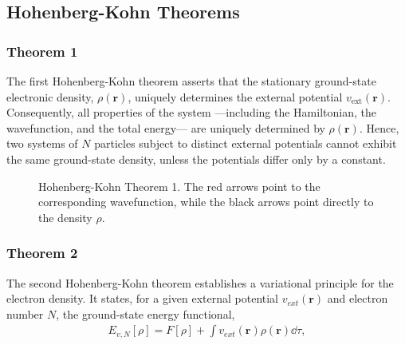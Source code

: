 \vfill%
\subsection{Hohenberg-Kohn Theorems~\cite{Hohenberg1964}}\label{HKteoremitas}
\subsubsection{Theorem 1}

The first Hohenberg-Kohn theorem asserts that the stationary ground-state electronic
density, $\rho(\mathbf{r})$, uniquely determines the external potential
$v_{\text{ext}}(\mathbf{r})$. Consequently, all
properties of the system ---including the Hamiltonian, the wavefunction, and the
total energy--- are uniquely determined by $\rho(\mathbf{r})$. Hence, two systems
of $N$ particles subject to distinct external potentials cannot exhibit the same
ground-state density, unless the potentials differ only by a constant.



\begin{figure}[H]
  
  \caption{Hohenberg-Kohn Theorem 1. The red arrows point to the corresponding
    wavefunction, while the black arrows point directly to the density $\rho$.}
\end{figure}

\newpage
\subsubsection{Theorem 2}

The second Hohenberg-Kohn theorem establishes a variational principle for the
electron density. It states, for a given external potential
$v_{ext}(\mathbf{r})$ and electron number $N$, the ground-state energy
functional,
%
\begin{align}
  E_{v, N} [\rho] = F[\rho] + \int v_{ext}(\mathbf{r})\rho(\mathbf{r}) \dd\tau,
\end{align}

